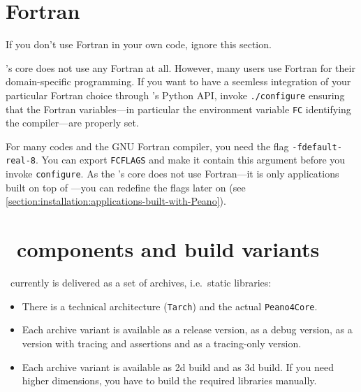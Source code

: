 \section{Fortran}

\begin{remark} 
 If you don't use Fortran in your own code, ignore this section.
\end{remark}

\Peano's core does not use any Fortran at all. 
However, many users use Fortran for their domain-specific programming.
If you want to have a seemless integration of your particular Fortran choice
through \Peano's Python API, invoke \texttt{./configure} ensuring that the
Fortran variables---in particular the environment variable \texttt{FC}
identifying the compiler---are properly set.


For many codes and the GNU Fortran compiler, you need the flag
\texttt{-fdefault-real-8}.
You can export \texttt{FCFLAGS} and make it contain this argument before you
invoke \texttt{configure}.
As the \Peano's core does not use Fortran---it is only applications built on top
of \Peano---you can redefine the flags later on (see \ref{section:installation:applications-built-with-Peano}).



\section{\Peano\ components and build variants}
\label{chapter:installation:build-variants}

\Peano\ currently is delivered as a set of archives, i.e.~static libraries:
\begin{itemize}
  \item There is a technical architecture (\texttt{Tarch}) and the actual
  \texttt{Peano4Core}.
  \item Each archive variant is available as a release version, as a debug
  version, as a version with tracing and assertions and as a tracing-only
  version.
  \item Each archive variant is available as 2d build and as 3d build. If you
  need higher dimensions, you have to build the required libraries manually.
\end{itemize}


